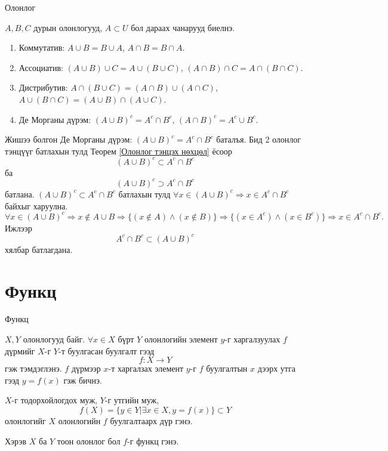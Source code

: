 \begin{frame}[allowframebreaks]{Олонлог}
\begin{theorem}\label{Олонлогийн тэнцэтгэлцлийн хууль}
    $A, B, C$ дурын олонлогууд, $A\subset U$ бол дараах чанарууд биелнэ.
\begin{enumerate}
  \item Коммутатив: $A\cup B=B\cup A$, $A\cap B=B\cap A$.
  \item Ассоциатив: $(A\cup B)\cup C=A\cup(B\cup C)$, $(A\cap B)\cap C=A\cap(B\cap C)$.
  \item Дистрибутив: $A\cap(B\cup C)=(A\cap B)\cup(A\cap C)$, $A\cup(B\cap C)=(A\cup B)\cap(A\cup C)$.
  \item Де Морганы дүрэм: $(A\cup B)^c=A^c\cap B^c$, $(A\cap B)^c=A^c\cup B^c$.
\end{enumerate}
\end{theorem}
\begin{prof}
    Жишээ болгон Де Морганы дүрэм: $(A\cup B)^c=A^c\cap B^c$ баталъя. 
    Бид 2 олонлог тэнцүүг батлахын тулд Теорем \ref{Олонлог тэнцэх нөхцөл} ёсоор $$(A\cup B)^c\subset A^c\cap B^c$$ ба $$(A\cup B)^c\supset A^c\cap B^c$$ батлана. $(A\cup B)^c\subset A^c\cap B^c$ батлахын тулд 
 $\forall x\in (A\cup B)^c\Rightarrow x\in A^c\cap B^c$ байхыг харуулна. 
 $$\forall x\in (A\cup B)^c\Rightarrow x\notin A\cup B \Rightarrow \{(x\notin A) \land (x\notin B)\}\Rightarrow \{(x\in A^c) \land (x\in B^c)\}\Rightarrow x\in A^c\cap B^c.$$ Ижлээр 
 $$ A^c\cap B^c\subset (A\cup B)^c$$ хялбар батлагдана.
\end{prof}
\end{frame}

\section{Функц}
\begin{frame}[allowframebreaks]{Функц}
\begin{definition}[Функц]
$X , Y$ олонлогууд байг. $\forall x\in X$ бүрт $Y$ олонлогийн элемент $y$-г харгалзуулах $f$ дүрмийг $X$-г $Y$-т буулгасан буулгалт гээд  $$f:X\to Y$$ гэж тэмдэглэнэ. $f$ дүрмээр $x$-т харгалзах элемент $y$-г $f$ буулгалтын $x$ дээрх утга гээд $y=f(x)$ гэж бичнэ. 


$X$-г тодорхойлогдох муж, $Y$-г утгийн муж, 
$$f(X)=\{y\in Y|\exists x\in X, y=f(x)\}\subset Y$$ олонлогийг $X$ олонлогийн $f$ буулгалтаарх дүр гэнэ.  
\end{definition}
Хэрэв $X$ ба $Y$ тоон олонлог бол   $f$-г функц гэнэ.
\end{frame}

